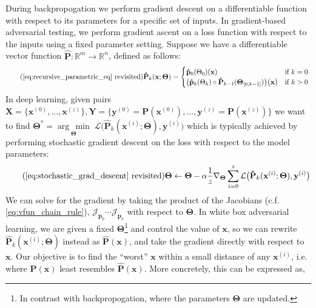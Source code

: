 \documentclass[12pt,initial,twoside,maitrise]{dms}
\newcommand{\argmin}[1]{\underset{#1}{\operatorname{arg}\,\operatorname{min}}\;}
\numberwithin{equation}{section}
\numberwithin{table}{chapter}
\numberwithin{figure}{chapter}
\begin{document}
During backpropogation we perform gradient descent on a differentiable function with respect to its parameters for a specific set of inputs. In gradient-based adversarial testing, we perform gradient ascent on a loss function with respect to the inputs using a fixed parameter setting. Suppose we have a differentiable vector function $\mathbf{\hat P}: \mathbb{R}^m\rightarrow\mathbb{R}^n$, defined as follows:
%
\begin{equation} \tag{\autoref{eq:recursive_parametric_eq} revisited}
    \mathbf{\hat P}_k(\mathbf{x}; \mathbf{\Theta}) = \begin{cases} \mathbf{\hat p}_0(\Theta_0)(\mathbf{x}) &\text{if } k=0\\ \big(\mathbf{\hat p}_k(\Theta_k)\circ \mathbf{\hat P}_{k-1}(\mathbf{\Theta}_{[0, k-1]})\big)\big(\mathbf{x}\big)&\text{if } k > 0 \end{cases} \\
\end{equation}
%
In deep learning, given pairs $\mathbf{X} = \{\mathbf{x}^{(0)}, \dots, \mathbf{x}^{(z)}\}, \mathbf{Y} = \{\mathbf{y}^{(0)} = \mathbf{P}(\mathbf{x}^{(0)}), \dots, \mathbf{y}^{(z)} = \mathbf{P}(\mathbf{x}^{(z)})\}$ we want to find $\mathbf{\Theta}^* = \argmin{\boldsymbol{\Theta}}\mathcal{L}\big(\mathbf{\hat P}_k(\mathbf{x}^{(i)}; \mathbf{\Theta}), \mathbf{y}^{(i)}\big)$ which is typically achieved by performing stochastic gradient descent on the loss with respect to the model parameters:
%
\begin{equation} \tag{\autoref{eq:stochastic_grad_descent} revisited}
    \mathbf\Theta \leftarrow \mathbf\Theta - \alpha\frac{1}{z}\nabla_{\mathbf\Theta} \sum_{i=0}^z\mathcal{L}\big(\mathbf{\hat P}_k(\mathbf{x}^{(i)}; \mathbf{\Theta}), \mathbf{y}^{(i)}\big)
\end{equation}
%
We can solve for the gradient by taking the product of the Jacobians (c.f. \autoref{eq:vfun_chain_rule}), $\mathcal{J}_{\mathbf{p}_0} \cdots \mathcal{J}_{\mathbf{p}_k}$ with respect to $\mathbf{\Theta}$. In white box adversarial learning, we are given a fixed $\mathbf \Theta$\footnote{In contrast with backpropogation, where the parameters $\mathbf\Theta$ are updated.} and control the value of $\mathbf x$, so we can rewrite $\mathbf{\hat P}_k(\mathbf{x}^{(i)};\mathbf\Theta)$ instead as $\mathbf{\hat P}(\mathbf x)$, and take the gradient directly with respect to $\mathbf x$. Our objective is to find the ``worst'' $\mathbf x$ within a small distance of any $\mathbf x^{(i)}$, i.e. where $\mathbf{P}(\mathbf x)$ least resembles $\mathbf{\hat P}(\mathbf x)$. More concretely, this can be expressed as,
\end{document}
